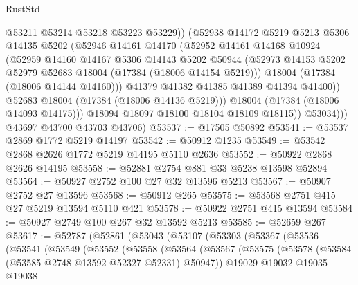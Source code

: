 \begin{lexlean}{RustStd}
\begin{coremodule}
                      @53211
                      @53214
                      @53218
                      @53223
                      @53229))
                  (@52938
                    @14172
                    @5219
                    @5213
                    @5306
                    @14135
                    @5202
                    (@52946
                      @14161
                      @14170
                      (@52952
                        @14161
                        @14168
                        @10924
                        (@52959
                          @14160
                          @14167
                          @5306
                          @14143
                          @5202
                          @50944
                          (@52973 @14153 @5202 @52979 @52683 @18004 (@17384 (@18006 @14154 @5219)))
                          @18004
                          (@17384 (@18006 @14144 @14160)))
                        @41379
                        @41382
                        @41385
                        @41389
                        @41394
                        @41400))
                    @52683
                    @18004
                    (@17384 (@18006 @14136 @5219)))
                  @18004
                  (@17384 (@18006 @14093 @14175)))
                @18094
                @18097
                @18100
                @18104
                @18109
                @18115))
            @53034)))
      @43697
      @43700
      @43703
      @43706)
@53537 := @17505 @50892
@53541 := @53537 @2869 @1772 @5219 @14197
@53542 := @50912 @1235
@53549 := @53542 @2868 @2626 @1772 @5219 @14195 @5110 @2636
@53552 := @50922 @2868 @2626 @14195
@53558 := @52881 @2754 @881 @33 @5238 @13598 @52894
@53564 := @50927 @2752 @100 @27 @32 @13596 @5213
@53567 := @50907 @2752 @27 @13596
@53568 := @50912 @265
@53575 := @53568 @2751 @415 @27 @5219 @13594 @5110 @421
@53578 := @50922 @2751 @415 @13594
@53584 := @50927 @2749 @100 @267 @32 @13592 @5213
@53585 := @52659 @267
@53617 := @52787
    (@52861
      (@53043
        (@53107
          (@53303
            (@53367
              (@53536
                (@53541
                  (@53549
                    (@53552
                      (@53558
                        (@53564
                          (@53567
                            (@53575
                              (@53578 (@53584 (@53585 @2748 @13592 @52327 @52331) @50947))
                              @19029
                              @19032
                              @19035
                              @19038

\end{coremodule}
\end{lexlean}
